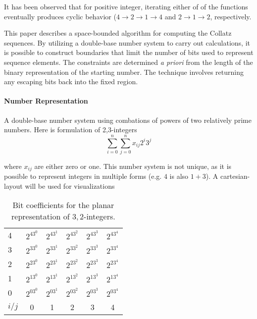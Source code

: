 \documentclass{article}
\begin{document}
It has been observed that for positive integer, iterating either of of the functions
eventually produces cyclic behavior ($4\rightarrow 2\rightarrow 1\rightarrow 4$ and
$2\rightarrow1\rightarrow2$, respectively.

This paper describes a space-bounded algorithm for computing the Collatz
sequences.  By utilizing a double-base number system to carry out calculations,
it is possible to construct boundaries that limit the number of bits used to
represent sequence elements.  The constraints are determined \emph{a priori}
from the length of the binary representation of the starting number. The technique
involves returning any escaping bits back into the fixed region.

\paragraph{Number Representation}

A double-base number system using combations of powers of two relatively prime numbers.
Here is formulation of {2,3}-integers
\begin{equation}
  \sum_{i=0}^n \sum_{j=0}^n x_{ij} 2^i3^j
\end{equation}

where $x_{ij}$ are either zero or one. This number system is not unique, as it is possible
to represent integers in multiple forms (e.g. $4$ is also $1 + 3$). A
cartesian-layout will be used for visualizations

\begin{table}
  \begin{center}
  \begin{tabular}{lccccc}
  4 & $2^43^0$ & $2^43^1$& $2^43^2$& $2^43^3$& $2^43^4$ \\
  3 & $2^33^0$ & $2^33^1$& $2^33^2$& $2^33^3$& $2^33^4$ \\
  2 & $2^23^0$ & $2^23^1$& $2^23^2$& $2^23^3$& $2^23^4$ \\
  1 & $2^13^0$ & $2^13^1$& $2^13^2$& $2^13^3$& $2^13^4$ \\
  0 & $2^03^0$ & $2^03^1$& $2^03^2$& $2^03^3$& $2^03^4$ \\
  $i/j$ & 0 & 1 & 2 & 3 & 4
  \end{tabular}
  \end{center}
  \caption{
    Bit coefficients for the planar representation of ${3,2}$-integers.}
\end{table}
\end{document}
